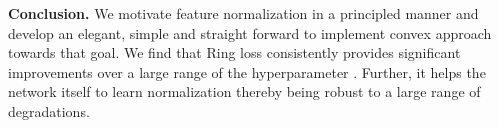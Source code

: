 \documentclass[10pt,twocolumn,letterpaper]{article}
\begin{document}
\textbf{Conclusion.} We motivate feature normalization in a principled manner and develop an elegant, simple and straight forward to implement convex approach towards that goal. We find that Ring loss consistently provides significant improvements over a large range of the hyperparameter . Further, it helps the network itself to learn normalization thereby being robust to a large range of degradations.










{\small


}
\end{document}
